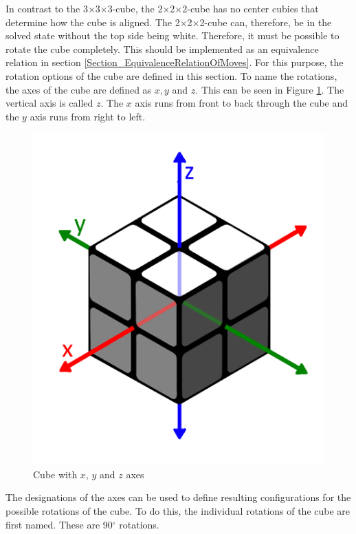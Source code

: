 \documentclass[12pt,a4paper]{article}
\theoremstyle{custom}
\newcommand{\Ttwo}{2$\times$2$\times$2-}
\newcommand{\Tthree}{3$\times$3$\times$3-}
\begin{document}
In contrast to the \Tthree cube, the \Ttwo cube has no center cubies that determine how the cube is aligned.
The \Ttwo cube can, therefore, be in the solved state without the top side being white. Therefore, it must be possible to rotate the cube completely.
This should be implemented as an equivalence relation in section \ref{Section_EquivalenceRelationOfMoves}. For this purpose, the rotation options of the cube are defined in this section.
To name the rotations, the axes of the cube are defined as $x, y$ and $z$. This can be seen in Figure \ref{Image_Axes of Rotation}. The vertical axis is called $z$. The $x$ axis runs from front to back through the cube and the $y$ axis runs from right to left.
\begin{figure}[H]
\centering
\includegraphics[scale=0.13]{Axis.png}
\caption[Cube with $x, y$ and $z$ axes]{Cube with $x$, $y$ and $z$ axes}
\label{Image_Axes of Rotation}
\end{figure}

The designations of the axes can be used to define resulting configurations for the possible rotations of the cube.
To do this, the individual rotations of the cube are first named. These are 90$^\circ$ rotations.
\end{document}
